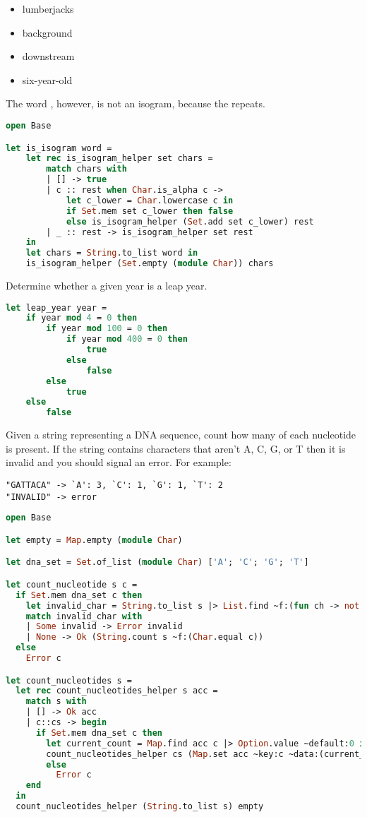 \begin{itemize}
  \item lumberjacks
  \item background
  \item downstream
  \item six-year-old
\end{itemize}
The word , however, is not an isogram, because the  repeats.

\begin{lstlisting}[language=OCaml]
open Base

let is_isogram word =
    let rec is_isogram_helper set chars =
        match chars with
        | [] -> true
        | c :: rest when Char.is_alpha c ->
            let c_lower = Char.lowercase c in
            if Set.mem set c_lower then false
            else is_isogram_helper (Set.add set c_lower) rest
        | _ :: rest -> is_isogram_helper set rest
    in
    let chars = String.to_list word in
    is_isogram_helper (Set.empty (module Char)) chars
\end{lstlisting}

Determine whether a given year is a leap year.

\begin{lstlisting}[language=OCaml]
let leap_year year =
    if year mod 4 = 0 then
        if year mod 100 = 0 then
            if year mod 400 = 0 then
                true
            else
                false
        else
            true
    else
        false
\end{lstlisting}

Given a string representing a DNA sequence, count how many of each nucleotide is present.
If the string contains characters that aren't A, C, G, or T then it is invalid and you should signal an error.
For example:
\begin{verbatim}
"GATTACA" -> `A': 3, `C': 1, `G': 1, `T': 2
"INVALID" -> error
\end{verbatim}

\begin{lstlisting}[language=OCaml]
open Base

let empty = Map.empty (module Char)

let dna_set = Set.of_list (module Char) ['A'; 'C'; 'G'; 'T']

let count_nucleotide s c =
  if Set.mem dna_set c then
    let invalid_char = String.to_list s |> List.find ~f:(fun ch -> not (Set.mem dna_set ch)) in
    match invalid_char with
    | Some invalid -> Error invalid
    | None -> Ok (String.count s ~f:(Char.equal c))
  else
    Error c

let count_nucleotides s =
  let rec count_nucleotides_helper s acc =
    match s with
    | [] -> Ok acc
    | c::cs -> begin
      if Set.mem dna_set c then
        let current_count = Map.find acc c |> Option.value ~default:0 in
        count_nucleotides_helper cs (Map.set acc ~key:c ~data:(current_count + 1))
        else
          Error c
    end
  in
  count_nucleotides_helper (String.to_list s) empty
\end{lstlisting}


